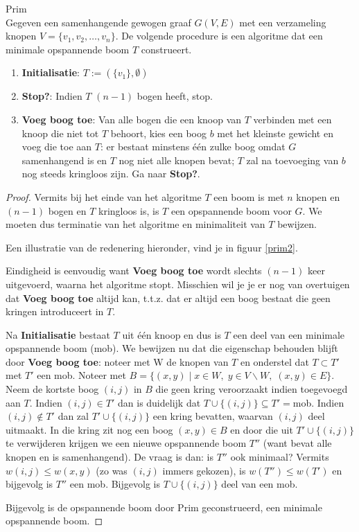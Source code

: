 \begin{algo} Prim \label{prim}\\
  Gegeven een samenhangende gewogen graaf $G(V,E)$ met een verzameling
  knopen $V =
  \{v_{1},v_{2},\ldots,v_{n}\}$.  De volgende procedure is een algoritme
  dat een minimale opspannende boom $T$ construeert.
\begin{enumerate}
\item \textbf{Initialisatie}: $T := (\{v_{1}\},\emptyset)$
\item \textbf{Stop?}: Indien $T$ $(n-1)$ bogen heeft, stop.
\item \textbf{Voeg boog toe}: 
Van alle bogen die een knoop van $T$ verbinden met een knoop die niet tot $T$
behoort, kies een boog $b$ met het kleinste gewicht en voeg
die toe aan $T$: er bestaat minstens \'{e}\'{e}n zulke boog omdat $G$
samenhangend is en $T$ nog niet alle knopen bevat; $T$ zal na
toevoeging van $b$ nog steeds kringloos zijn.
Ga naar \textbf{Stop?}.
\end{enumerate}
\end{algo}
\begin{proof} Vermits bij het einde van het algoritme $T$ een boom
is met $n$ knopen en $(n-1)$ bogen en $T$ kringloos is, is $T$ een opspannende
boom voor $G$. We moeten dus terminatie van het algoritme en
minimaliteit van $T$ bewijzen.

Een illustratie van de redenering hieronder, vind je in figuur
\ref{prim2}.

Eindigheid is eenvoudig want \textbf{Voeg boog toe} wordt slechts
$(n-1)$ keer uitgevoerd, waarna het algoritme stopt. Misschien wil je je
er nog van overtuigen dat \textbf{Voeg boog toe} altijd kan, t.t.z.
dat er altijd een boog bestaat die geen kringen introduceert in $T$.

Na \textbf{Initialisatie} bestaat $T$ uit \'{e}\'{e}n knoop en dus is $T$
een deel van een minimale opspannende boom (mob). We bewijzen nu dat
die eigenschap behouden blijft door \textbf{Voeg boog toe}: noteer met
W de knopen van $T$ en onderstel dat $T \subset T'$ met $T'$ een mob.
Noteer met $B = \{(x,y)\;|\; x \in W,\; y \in V \backslash W,\; (x,y) \in
E\}$.  Neem de kortste boog $(i,j)$ in $B$ die geen kring veroorzaakt
indien toegevoegd aan $T$. Indien $(i,j) \in T'$ dan is duidelijk dat $T
\cup \{(i,j)\} \subseteq T' = $mob. Indien $(i,j) \notin T'$ dan zal
$T' \cup \{(i,j)\}$ een kring bevatten, waarvan $(i,j)$ deel uitmaakt.
In die kring zit nog een boog $(x,y) \in B$ en door die uit $T' \cup
\{(i,j)\}$ te verwijderen krijgen we een nieuwe opspannende boom $T''$
(want bevat alle knopen en is samenhangend). De vraag is dan: is $T''$
ook minimaal? Vermits $w(i,j) \leq w(x,y)$ (zo was $(i,j)$ immers
gekozen), is $w(T'') \leq w(T')$ en bijgevolg is $T''$ een mob.
Bijgevolg is $T \cup \{(i,j)\}$ deel van een mob.

Bijgevolg is de opspannende boom door Prim geconstrueerd, een minimale
opspannende boom.
\end{proof}

